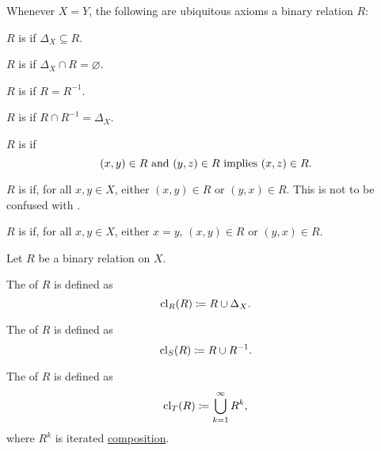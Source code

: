 \begin{definition}
  Whenever \( X = Y \), the following are ubiquitous axioms a binary relation \( R \):
  \begin{DefEnum}[resume=def:binary_relation]
     \( R \) is  if \( \Delta_X \subseteq R \).

     \( R \) is  if \( \Delta_X \cap R = \varnothing \).

     \( R \) is  if \( R = R^{-1} \).

     \( R \) is  if \( R \cap R^{-1} = \Delta_X \).

     \( R \) is  if
    \begin{equation*}
      (x, y) \in R \text{ and } (y, z) \in R \text{ implies } (x, z) \in R.
    \end{equation*}

     \( R \) is  if, for all \( x, y \in X \), either \( (x, y) \in R \) or \( (y, x) \in R \). This is not to be confused with .

     \( R \) is  if, for all \( x, y \in X \), either \( x = y \), \( (x, y) \in R \) or \( (y, x) \in R \).
  \end{DefEnum}
\end{definition}

\begin{definition}\label{def:derived_relations}
  Let \( R \) be a binary relation on \( X \).

  \begin{DefEnum}
     The  of \( R \) is defined as
    \begin{equation*}
      \operatorname{cl}_R(R) \coloneqq R \cup \Delta_X.
    \end{equation*}

     The  of \( R \) is defined as
    \begin{equation*}
      \operatorname{cl}_S(R) \coloneqq R \cup R^{-1}.
    \end{equation*}

     The  of \( R \) is defined as
    \begin{equation*}
      \operatorname{cl}_T(R) \coloneqq \bigcup_{k=1}^\infty R^k,
    \end{equation*}
    where \( R^k \) is iterated \hyperref[def:binary_relation/composition]{composition}.
  \end{DefEnum}
\end{definition}

